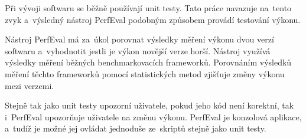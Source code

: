 \documentclass[12pt]{report}
\begin{document}

Při vývoji softwaru se běžně používají unit testy. Tato práce navazuje na~tento
zvyk a~výsledný nástroj PerfEval podobným způsobem provádí testování výkonu.

Nástroj PerfEval má za~úkol porovnat výsledky měření výkonu dvou verzí softwaru
a~vyhodnotit jestli je výkon novější verze horší. Nástroj využívá výsledky měření
běžných benchmarkovacích frameworků. Porovnáním výsledků měření těchto frameworků
pomocí statistických metod zjišťuje změny výkonu mezi verzemi.

Stejně tak jako unit testy upozorní uživatele, pokud jeho kód není korektní,
tak i~PerfEval upozorňuje uživatele na změnu výkonu.
PerfEval je konzolová aplikace, a~tudíž je možné jej ovládat jednoduše ze~skriptů stejně jako unit testy.
\end{document}
